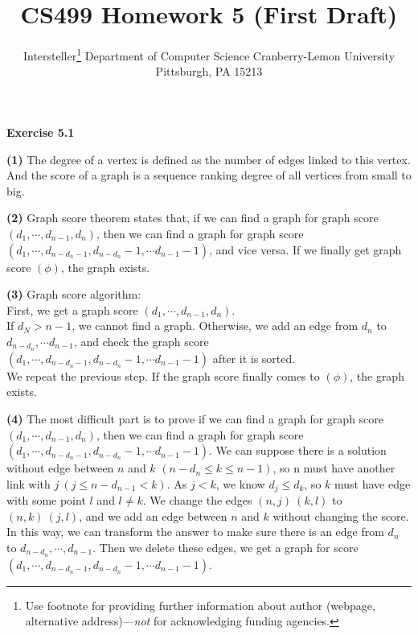 \documentclass{article} %
\title{CS499 Homework 5 (First Draft)}
\author{
	Intersteller\thanks{ Use footnote for providing further information
		about author (webpage, alternative address)---\emph{not} for acknowledging
		funding agencies.}
	Department of Computer Science
	Cranberry-Lemon University
	Pittsburgh, PA 15213
}
\begin{document}
	\maketitle
	\textbf{Exercise 5.1}\par

\textbf{(1)} The degree of a vertex is defined as the number of edges linked to this vertex. And the score of a graph is a sequence ranking degree of all vertices from small to big.\par

\textbf{(2)} Graph score theorem states that, if we can find a graph for graph score $(d_1, \cdots ,d_{n-1},d_n)$, then we can find a graph for graph score $(d_1, \cdots ,d_{n-d_n-1},d_{n-d_n}-1,\cdots d_{n-1}-1)$, and vice versa. If we finally get graph score $(\phi)$, the graph exists.\par

\textbf{(3)} Graph score algorithm:\\
First, we get a graph score $(d_1, \cdots ,d_{n-1},d_n)$.\\
If $d_N>n-1$, we cannot find a graph. Otherwise, we add an edge from $d_n$ to $d_{n-d_n},\cdots d_{n-1}$, and check the graph score $(d_1, \cdots ,d_{n-d_n-1},d_{n-d_n}-1,\cdots d_{n-1}-1)$ after it is sorted.\\
We repeat the previous step. If the graph score finally comes to $(\phi)$, the graph exists.\par

\textbf{(4)} The most difficult part is to prove if we can find a graph for graph score $(d_1, \cdots ,d_{n-1},d_n)$, then we can find a graph for graph score $(d_1, \cdots ,d_{n-d_n-1},d_{n-d_n}-1,\cdots d_{n-1}-1)$. We can suppose there is a solution without edge between $n$ and $k$ $(n-d_n\leq k\leq n-1)$, so n must have another link with $j \ (j\leq n-d_{n-1}<k)$. As $j<k$, we know $d_j\leq d_k$, so $k$ must have edge with some point $l$ and $l\neq k$. We change the edges $(n,j)\  (k,l)$ to $(n,k)\  (j,l)$, and we add an edge between $n$ and $k$ without changing the score. In this way, we can transform the answer to make sure there is an edge from $d_n$ to $d_{n-d_n},\cdots ,d_{n-1}$. Then we delete these edges, we get a graph for score $(d_1, \cdots ,d_{n-d_n-1},d_{n-d_n}-1,\cdots d_{n-1}-1)$.\par
\end{document}
